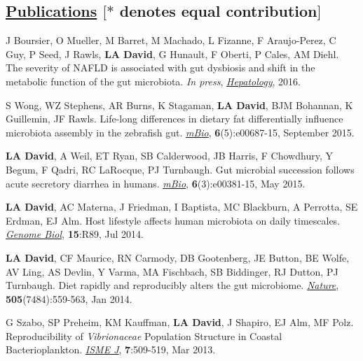 \documentclass[overlapped,line,11pt]{res}
\begin{document}
\begin{resume}
\section{\underline{\sc Publications} \hspace{2.95in} \sc $[\ast$ denotes equal
      contribution$]$}

\vspace{.25in}

\begin{revnumerate}[14]

\item {J Boursier, O Mueller, M Barret, M Machado, L Fizanne, F
  Araujo-Perez, C Guy, P Seed, J Rawls, \textbf{LA David}, G Hunault, F
  Oberti, P Cales, AM Diehl. The severity of NAFLD is associated with
  gut dysbiosis and shift in the metabolic function of the gut
  microbiota. \emph{In press}, \emph{\underline{Hepatology}}, 2016.}

\item {S Wong, WZ Stephens, AR Burns, K Stagaman, \textbf{LA David}, BJM
  Bohannan, K Guillemin, JF Rawls.  Life-long differences in dietary
  fat differentially influence microbiota assembly in the zebrafish
  gut. 
 \emph{\underline{mBio}}, \textbf{6}(5):e00687-15, September 2015.}

\item {\textbf{LA David}, A Weil, ET Ryan, SB Calderwood, JB Harris, F
  Chowdhury, Y Begum, F Qadri, RC LaRocque, PJ Turnbaugh.  Gut
  microbial succession follows acute secretory diarrhea in humans.
 \emph{\underline{mBio}}, \textbf{6}(3):e00381-15, May 2015.}

\item {\textbf{LA David}, AC Materna, J Friedman, I Baptista, MC
  Blackburn, A Perrotta, SE Erdman, EJ Alm.  Host lifestyle affects
  human microbiota on daily timescales.
  \emph{\underline{Genome Biol}}, \textbf{15}:R89, Jul 2014.}

\item {\textbf{LA David}, CF Maurice, RN Carmody, DB Gootenberg, JE
  Button, BE Wolfe, AV Ling, AS Devlin, Y Varma, MA Fischbach, SB
  Biddinger, RJ Dutton, PJ Turnbaugh.  Diet rapidly and reproducibly
  alters the gut microbiome. \emph{\underline{Nature}},
  \textbf{505}(7484):559-563, Jan 2014.}

\item {G Szabo, SP Preheim, KM Kauffman, \textbf{LA David}, J Shapiro,
  EJ Alm, MF Polz.  Reproducibility of \emph{Vibrionaceae} Population
  Structure in Coastal Bacterioplankton. \emph{\underline{ISME J}},
  \textbf{7}:509-519, Mar 2013.}


\end{revnumerate}
\end{resume}
\end{document}
